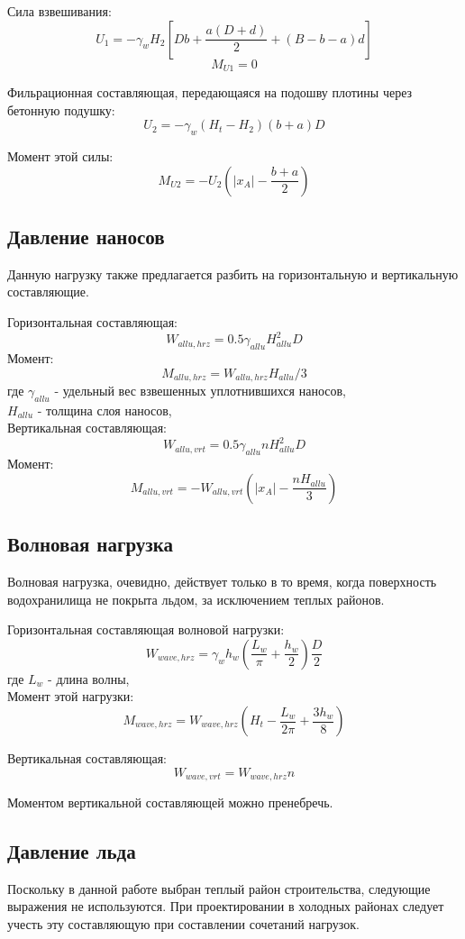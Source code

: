 \documentclass[12pt,a4paper,oneside,draft,titlepage]{article}
\begin{document}
Сила взвешивания:
$$ U_1 = -\gamma_w  H_2  [D  b + \frac{a  (D + d) }{2} + (B - b - a) d] $$
$$ M_{U1} = 0 $$

Фильрационная составляющая, передающаяся на подошву плотины через бетонную подушку:
$$ U_2 = -\gamma_w (H_t - H_2)  (b + a)  D $$

Момент этой силы:
$$ M_{U2} = -U_2  (|x_A| - \frac{b + a}{2}) $$

\subsection{Давление наносов}

Данную нагрузку также предлагается разбить на горизонтальную и вертикальную составляющие.

Горизонтальная составляющая:
$$ W_{allu,hrz} = 0.5  \gamma_{allu}  H_{allu} ^ 2  D $$
Момент:
$$ M_{allu,hrz} = W_{allu,hrz}  H_{allu} / 3 $$
где $\gamma_{allu}$ - удельный вес взвешенных уплотнившихся наносов,\\
$H_{allu}$ - толщина слоя наносов,\\

Вертикальная составляющая:
$$ W_{allu,vrt} = 0.5  \gamma_{allu}  n  H_{allu} ^ 2  D $$
Момент:
$$ M_{allu,vrt} = -W_{allu,vrt}(|x_A| - \frac{n  H_{allu}}{3}) $$

\subsection{Волновая нагрузка}

Волновая нагрузка, очевидно, действует только в то время, когда поверхность водохранилища не покрыта льдом, за исключением теплых районов.

Горизонтальная составляющая волновой нагрузки:
$$ W_{wave,hrz} = \gamma_w  h_w  (\frac{L_w}{\pi}  + \frac{h_w}{2}) \frac{D}{2} $$
где $L_w$ - длина волны,\\
Момент этой нагрузки:
$$ M_{wave,hrz} = W_{wave,hrz}  (H_t - \frac{L_w }{ 2  \pi} + \frac{3 h_w}{8}) $$

Вертикальная составляющая:
$$ W_{wave,vrt} = W_{wave,hrz}  n $$

Моментом вертикальной составляющей можно пренебречь.

\subsection{Давление льда}

Поскольку в данной работе выбран теплый район строительства, следующие выражения не используются. При проектировании в холодных районах следует учесть эту составляющую при составлении сочетаний нагрузок.
\end{document}
